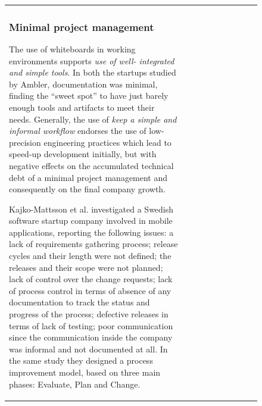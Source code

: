 \documentclass[12pt,journal,compsoc]{../sty/IEEEtran}
\begin{document}
\begin{table}[!t]
\begin{figure}[!t]
\begin{compactitem}
\begin{table}[!t]
\begin{tabular}{|l||c||c||c||c||c||c||c||c||c|}
\subsubsection{Minimal project management}

The use of whiteboards in working environments supports \textit{use of  well-
integrated and simple tools}. In both the startups studied by Ambler,
documentation was minimal, finding the ``sweet spot'' to have just barely enough
tools and artifacts to meet their needs. Generally, the use of \textit{keep a
simple and informal workflow} endorses the use of low-precision engineering
practices which lead to speed-up development initially, but with negative
effects on the accumulated technical debt of a minimal project management and
consequently on the final company growth.

Kajko-Mattsson et al. \cite{Kajko-Mattsson2008} investigated a Swedish software
startup company involved in mobile applications, reporting the following issues:
a lack of requirements gathering process; release cycles and their length were
not defined; the releases and their scope were not planned; lack of control over
the change requests; lack of process control in terms of  absence of any
documentation to track the status and progress of the process; defective
releases in terms of lack of testing; poor communication since the communication
inside the company was informal and not documented at all. In the same study
they designed a process improvement model, based on three main phases: Evaluate,
Plan and Change.


\end{tabular}
\end{table}
\end{compactitem}
\end{figure}
\end{table}
\end{document}
